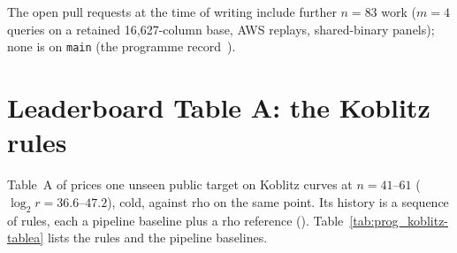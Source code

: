 The open pull requests at the time of writing include further $n=83$ work
($m=4$ queries on a retained 16{,}627-column base, AWS replays, shared-binary
panels); none is on \texttt{main} (the programme record~\cite{icprogram2026}).

\section{Leaderboard Table A: the Koblitz rules}\label{sec:tablea}

Table~A of  prices one unseen public target on
Koblitz curves at $n=41$--$61$ ($\log_2r=36.6$--$47.2$), cold, against rho on
the same point. Its history is a sequence of rules, each a pipeline baseline
plus a rho reference ().
Table~\ref{tab:prog_koblitz-tablea} lists the rules and the pipeline
baselines.


